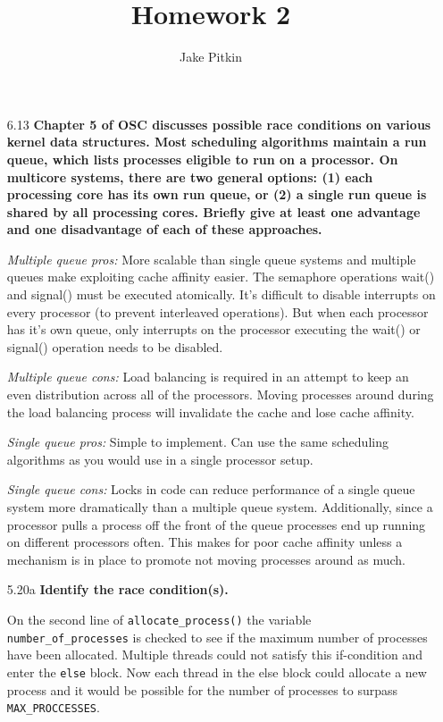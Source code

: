 \documentclass[11pt, letterpaper]{hw}
\title{Homework 2}
\institute{University of Utah}
\author{Jake Pitkin}
\begin{document}
\maketitle

\begin{enumerate}

\item [6.13] \textbf{Chapter 5 of OSC discusses possible race conditions on various kernel data structures. Most scheduling algorithms maintain a run queue, which lists processes eligible to run on a processor. On multicore systems, there are two general options: (1) each processing core has its own run queue, or (2) a single run queue is shared by all processing cores. Briefly give at least one advantage and one disadvantage of each of these approaches.}

{\it Multiple queue pros:} More scalable than single queue systems and multiple queues make exploiting cache affinity easier. The semaphore operations wait() and signal() must be executed atomically. It's difficult to disable interrupts on every processor (to prevent interleaved operations). But when each processor has it's own queue, only interrupts on the processor executing the wait() or signal() operation needs to be disabled. 

{\it Multiple queue cons:} Load balancing is required in an attempt to keep an even distribution across all of the processors. Moving processes around during the load balancing process will invalidate the cache and lose cache affinity.

{\it Single queue pros:} Simple to implement. Can use the same scheduling algorithms as you would use in a single processor setup.

{\it Single queue cons:} Locks in code can reduce performance of a single queue system more dramatically than a multiple queue system. Additionally, since a processor pulls a process off the front of the queue processes end up running on different processors often. This makes for poor cache affinity unless a mechanism is in place to promote not moving processes around as much.

\item [5.20a] \textbf{Identify the race condition(s).}

On the second line of {\tt allocate\_process()} the variable {\tt number\_of\_processes} is checked to see if the maximum number of processes have been allocated. Multiple threads could not satisfy this if-condition and enter the {\tt else} block. Now each thread in the else block could allocate a new process and it would be possible for the number of processes to surpass {\tt MAX\_PROCCESSES}.


\end{enumerate}
\end{document}
